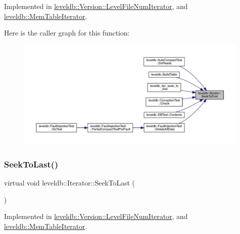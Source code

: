 Implemented in \mbox{\hyperlink{classleveldb_1_1_version_1_1_level_file_num_iterator_a8e5d34bf0c1e17e83bbb9941821a7ee2}{leveldb\+::\+Version\+::\+Level\+File\+Num\+Iterator}}, and \mbox{\hyperlink{classleveldb_1_1_mem_table_iterator_a72eaf5c1bcb6d513f71d4edcb8db3f98}{leveldb\+::\+Mem\+Table\+Iterator}}.

Here is the caller graph for this function\+:
\nopagebreak
\begin{figure}[H]
\begin{center}
\leavevmode
\includegraphics[width=350pt]{classleveldb_1_1_iterator_a3594967cf26ddf1d37c7b886bb48627e_icgraph}
\end{center}
\end{figure}
\mbox{\label{classleveldb_1_1_iterator_a8ad637f0a759e6d94cca6c5b4db440d3}} 
\subsubsection{\texorpdfstring{SeekToLast()}{SeekToLast()}}
{\footnotesize\ttfamily virtual void leveldb\+::\+Iterator\+::\+Seek\+To\+Last (\begin{DoxyParamCaption}{ }\end{DoxyParamCaption})\hspace{0.3cm}{\ttfamily [pure virtual]}}



Implemented in \mbox{\hyperlink{classleveldb_1_1_version_1_1_level_file_num_iterator_ac7fafc33c049d1e33fdf9b5ae99f73d8}{leveldb\+::\+Version\+::\+Level\+File\+Num\+Iterator}}, and \mbox{\hyperlink{classleveldb_1_1_mem_table_iterator_aaed044dc887a51c924086f2a2844a5f0}{leveldb\+::\+Mem\+Table\+Iterator}}.

